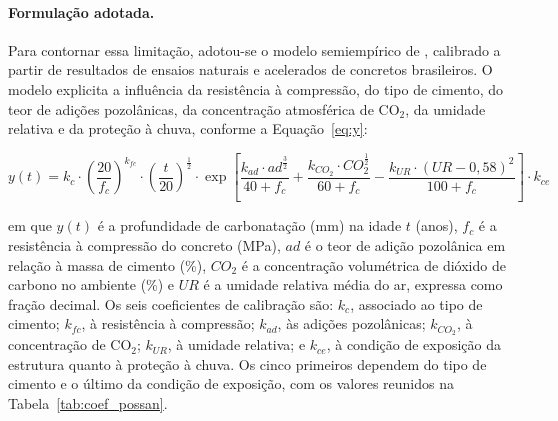 \paragraph{Formula\c{c}\~ao adotada.} Para contornar essa limitação, adotou-se o modelo semiempírico de \textcite{possan2010, possan2016co2}, calibrado a partir de resultados de ensaios naturais e acelerados de concretos brasileiros. O modelo explicita a influência da resistência à compressão, do tipo de cimento, do teor de adições pozolânicas, da concentração atmosférica de CO$_2$, da umidade relativa e da proteção à chuva, conforme a Equação~\eqref{eq:y}:

\begin{equation}\label{eq:y}
y(t) = k_c \cdot \left( \frac{20}{f_c} \right)^{k_{fc}} \cdot \left( \frac{t}{20} \right)^{\frac{1}{2}} \cdot \exp \left[ \frac{k_{ad} \cdot ad^{\frac{3}{2}}}{40 + f_c} + \frac{k_{CO_2} \cdot CO_2^{\frac{1}{2}}}{60 + f_c} - \frac{k_{UR} \cdot (UR - 0{,}58)^2}{100 + f_c} \right] \cdot k_{ce}
\end{equation}

\noindent em que $y(t)$ é a profundidade de carbonatação (mm) na idade $t$ (anos), $f_c$ é a resistência à compressão do concreto (MPa), $ad$ é o teor de adição pozolânica em relação à massa de cimento (\%), $CO_2$ é a concentração volumétrica de dióxido de carbono no ambiente (\%) e $UR$ é a umidade relativa média do ar, expressa como fração decimal. Os seis coeficientes de calibração são: $k_c$, associado ao tipo de cimento; $k_{fc}$, à resistência à compressão; $k_{ad}$, às adições pozolânicas; $k_{CO_2}$, à concentração de CO$_2$; $k_{UR}$, à umidade relativa; e $k_{ce}$, à condição de exposição da estrutura quanto à proteção à chuva. Os cinco primeiros dependem do tipo de cimento e o último da condição de exposição, com os valores reunidos na Tabela~\ref{tab:coef_possan}.

